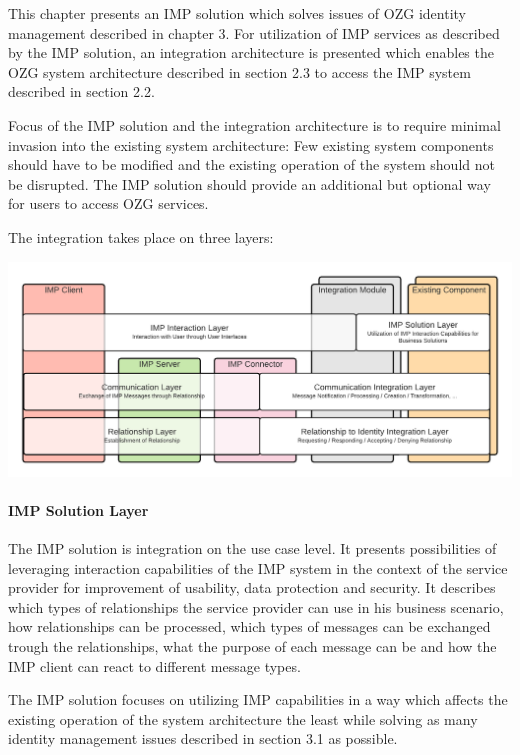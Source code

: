 This chapter presents an IMP solution which solves issues of OZG identity management described in chapter 3. For utilization of IMP services as described by the IMP solution, an integration architecture is presented which enables the OZG system architecture described in section 2.3 to access the IMP system described in section 2.2.

Focus of the IMP solution and the integration architecture is to require minimal invasion into the existing system architecture: Few existing system components should have to be modified and the existing operation of the system should not be disrupted. The IMP solution should provide an additional but optional way for users to access OZG services.

The integration takes place on three layers:

\begin{center}
    \includegraphics[scale=0.6]{Diagrams/Integration Architecture 1/IMP Layer Diagram Integration.pdf}
\end{center}

\paragraph{IMP Solution Layer} 
The IMP solution is integration on the use case level. It presents possibilities of leveraging interaction capabilities of the IMP system in the context of the service provider for improvement of usability, data protection and security. It describes which types of relationships the service provider can use in his business scenario, how relationships can be processed, which types of messages can be exchanged trough the relationships, what the purpose of each message can be and how the IMP client can react to different message types.

The IMP solution focuses on utilizing IMP capabilities in a way which affects the existing operation of the system architecture the least while solving as many identity management issues described in section 3.1 as possible.

